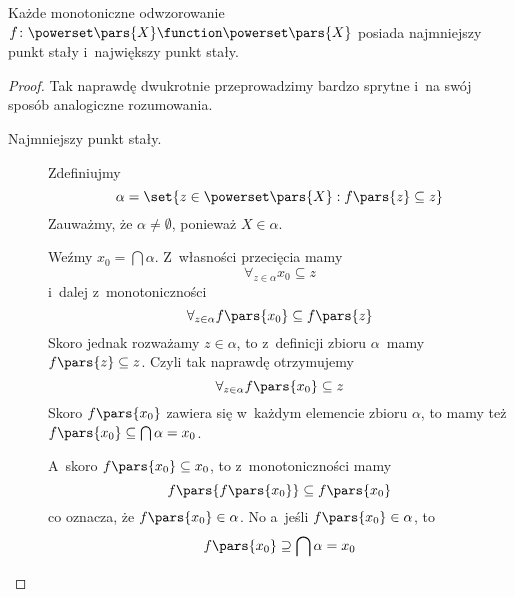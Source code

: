 \begin{theorem}
	Każde monotoniczne odwzorowanie \(f\colon \powerset\pars{X} \function \powerset\pars{X}\) posiada najmniejszy punkt stały i~największy punkt stały.
\end{theorem}
\begin{proof}
	Tak naprawdę dwukrotnie przeprowadzimy bardzo sprytne i~na swój sposób analogiczne rozumowania.
	\begin{description}
		\item[Najmniejszy punkt stały.] Zdefiniujmy
		      \begin{equation*}
			      \alpha = \set{z \in \powerset\pars{X} : f\pars{z} \subseteq z}
		      \end{equation*}
		      Zauważmy, że \(\alpha \neq \emptyset\), ponieważ \(X \in \alpha\).

		      Weźmy \(x_0 = \bigcap \alpha\). Z~własności przecięcia mamy
		      \begin{equation*}
			      \forall_{z \in \alpha} x_0 \subseteq z
		      \end{equation*}
		      i~dalej z~monotoniczności
		      \begin{equation*}
			      \forall_{z \in \alpha} f\pars{x_0} \subseteq f\pars{z}
		      \end{equation*}
		      Skoro jednak rozważamy \(z \in \alpha\), to z~definicji zbioru \(\alpha\)~mamy \(f\pars{z} \subseteq z\). Czyli tak naprawdę otrzymujemy
		      \begin{equation*}
			      \forall_{z \in \alpha} f\pars{x_0} \subseteq z
		      \end{equation*}
		      Skoro \(f\pars{x_0}\) zawiera się w~każdym elemencie zbioru \(\alpha\), to mamy też \(f\pars{x_0} \subseteq \bigcap \alpha = x_0\).

		      A~skoro \(f\pars{x_0} \subseteq x_0\), to z~monotoniczności mamy
		      \begin{equation*}
			      f\pars{f\pars{x_0}} \subseteq f\pars{x_0}
		      \end{equation*}
		      co oznacza, że \(f\pars{x_0} \in \alpha\). No a~jeśli \(f\pars{x_0} \in \alpha\), to
		      \begin{equation*}
			      f\pars{x_0} \supseteq \bigcap \alpha = x_0
		      \end{equation*}


\end{description}
\end{proof}
